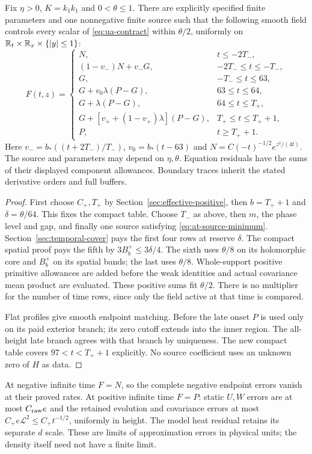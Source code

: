 \begin{theorem}
\label{thm:all-time}
Fix $\eta>0$, $K=k_1k_1$ and $0<\theta\le1$. There are explicitly
specified finite parameters and one nonnegative finite source such that
the following smooth field controls every scalar of
\eqref{eq:ua-contract} within $\theta/2$, uniformly on
$\mathbb R_t\times\mathbb R_x\times\{|y|\le1\}$:
\begin{equation}
 F(t,z)=\begin{cases}
 N,&t\le-2T_-,\\
 (1-v_-)N+v_-G,&-2T_-\le t\le-T_-,\\
 G,&-T_-\le t\le63,\\
 G+v_0\lambda(P-G),&63\le t\le64,\\
 G+\lambda(P-G),&64\le t\le T_+,\\
 G+[v_++(1-v_+)\lambda](P-G),&T_+\le t\le T_++1,\\
 P,&t\ge T_++1.
 \end{cases}
 \label{eq:at-field}
\end{equation}
Here $v_-=b_*((t+2T_-)/T_-)$, $v_0=b_*(t-63)$ and
$N=C(-t)^{-1/2}e^{z^2/(4t)}$. The source and parameters may depend
on $\eta,\theta$. Equation residuals have the sums of their displayed
component allowances. Boundary traces inherit the stated derivative
orders and full buffers.
\end{theorem}
\begin{proof}
First choose $C_+,T_+$ by Section~\ref{sec:effective-positive}, then
$b=T_++1$ and $\delta=\theta/64$. This fixes the compact table.
Choose $T_-$ as above, then $m$, the phase level and gap, and finally
one source satisfying \eqref{eq:at-source-minimum}.
Section~\ref{sec:temporal-cover} pays the first four rows at reserve
$\delta$. The compact spatial proof pays the fifth by
$3B_b^+\le3\delta/4$. The sixth uses $\theta/8$ on its holomorphic
core and $B_b^+$ on its spatial bands; the last uses $\theta/8$.
Whole-support positive primitive allowances are added before the weak
identities and actual covariance mean product are evaluated. These
positive sums fit $\theta/2$. There is no multiplier for the number of
time rows, since only the field active at that time is compared.

Flat profiles give smooth endpoint matching. Before the late onset $P$
is used only on its paid exterior branch; its zero cutoff extends into
the inner region. The all-height late branch agrees with that branch by
uniqueness. The new compact table covers $97<t<T_++1$ explicitly.
No source coefficient uses an unknown zero of $H$ as data.
\end{proof}
At negative infinite time $F=N$, so the complete negative endpoint
errors vanish at their proved rates. At positive infinite time $F=P$:
static $U,W$ errors are at most $C_{\rm raw}e$ and the retained evolution
and covariance errors at most $C_+e\mathcal L^2\le C_+t^{-1/2}$,
uniformly in height. The model heat residual retains its separate $d$
scale. These are limits of approximation errors in physical units;
the density itself need not have a finite limit.

